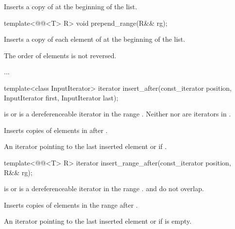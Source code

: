 \documentclass{wg21}
\begin{document}
\begin{itemdescr}
    \pnum
    \effects
    Inserts a copy of  at the beginning of the list.
\end{itemdescr}

\begin{addedblock}
\begin{itemdecl}
template<@@<T> R>
void prepend_range(R&& rg);
\end{itemdecl}

\begin{itemdescr}
\pnum
\effects
Inserts a copy of each element of  at the beginning of the list. \begin{note}
The order of elements is not reversed.
\end{note}
\end{itemdescr}
\end{addedblock}

...

\begin{itemdecl}
    template<class InputIterator>
    iterator insert_after(const_iterator position, InputIterator first, InputIterator last);
\end{itemdecl}

\begin{itemdescr}
    \pnum
    \expects
     is  or is a dereferenceable
    iterator in the range .
    Neither  nor  are iterators in .

    \pnum
    \effects
    Inserts copies of elements in  after .

    \pnum
    \returns
    An iterator pointing to the last inserted element or  if .
\end{itemdescr}

\begin{addedblock}
\begin{itemdecl}
template<@@<T> R>
iterator insert_range_after(const_iterator position, R&& rg);
\end{itemdecl}

\begin{itemdescr}
    \pnum
    \expects
     is  or is a dereferenceable
    iterator in the range .
     and  do not overlap.

    \pnum
    \effects
    Inserts copies of elements in the range  after .

    \pnum
    \returns
    An iterator pointing to the last inserted element or  if  is empty.
\end{itemdescr}
\end{addedblock}
\end{document}
